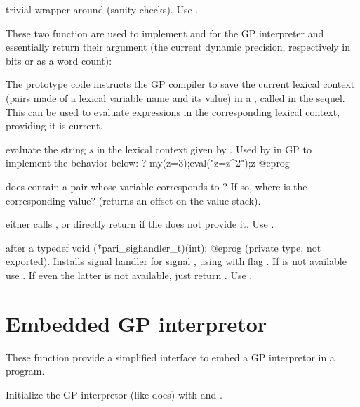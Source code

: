  trivial wrapper around 
(sanity checks). Use .

These two function are used to implement  and
 for the GP interpreter and essentially return their
argument (the current dynamic precision, respectively in bits or as a
 word count):





The prototype code  instructs the GP compiler to save the current
lexical context (pairs made of a lexical variable name and its value)
in a , called  in the sequel. This  can be used
to evaluate expressions in the corresponding lexical context, providing it is
current.

 evaluate the string $s$
in the lexical context given by .  Used by  in GP
to implement the behavior below:
\bprog
? my(z=3);eval("z=z^2");z
@eprog

 does  contain
a pair whose variable corresponds to ? If so, where is the
corresponding value? (returns an offset on the value stack).


 either calls , or directly
return  if the  does not provide it. Use .

 after a
\bprog
  typedef void (*pari_sighandler_t)(int);
@eprog\noindent
(private type, not exported). Installs signal handler  for
signal , using  with flag . If
 is not available use . If even the latter is not
available, just return . Use .

\section{Embedded GP interpretor}
These function provide a simplified interface to embed a GP
interpretor in a program.

Initialize the GP interpretor (like  does) with
  and .

